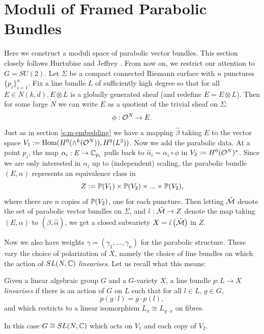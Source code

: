 	\section{Moduli of Framed Parabolic Bundles}
	Here we construct a moduli space of parabolic vector bundles. This section closely follows Hurtubise and Jeffrey \cite[\S 4]{hurtubise_representations_2000}. From now on, we restrict our attention to $G=SU(2)$. Let $\Sigma$ be a compact connected Riemann surface with $n$ punctures $\{p_i\}_{i=1}^n$. Fix a line bundle $L$ of sufficiently high degree so that for all $E\in N(k,d), E\otimes L$ is a globally generated sheaf (and redefine $E = E\otimes L$). Then for some large $N$ we can write $E$ as a quotient of the trivial sheaf on $\Sigma$:
	\begin{equation}
		\phi: \mathcal{O}^N \to E.
	\end{equation}
	Just as in section \ref{s:m-embedding} we have a mapping $\hat{\beta}$ taking $E$ to the vector space $V_1 := \text{Hom}(H^0(\wedge^k(\mathcal{O}^N)), H^0(L^2))$. Now we add the parabolic data. At a point $p_i$, the map $\alpha_i:E\to \mathbb{C}_{p_i}$ pulls back to $\hat{\alpha}_i = \alpha_i\circ \phi$ in $V_2 := H^0(\mathcal{O}^N)^\ast$. Since we are only interested in $\alpha_i$ up to (independent) scaling, the parabolic bundle $(E,\alpha)$ represents an equivalence class in
	\begin{equation}
		Z := \mathbb{P}(V_1) \times \mathbb{P}(V_2) \times ... \times \mathbb{P}(V_2),
	\end{equation}
	where there are $n$ copies of $\mathbb{P}(V_2)$, one for each puncture. Then letting $\tilde{\mathcal{M}}$ denote the set of parabolic vector bundles on $\Sigma$, and $\tilde{\iota}:\tilde{\mathcal{M}}\to Z$ denote the map taking $(E,\alpha)$ to $(\hat{\beta},\hat{\alpha})$, we get a closed subvariety $X = \tilde{\iota}\left(\tilde{\mathcal{M}}\right)$ in $Z$. 

	Now we also have weights $\gamma = (\gamma_1,...,\gamma_n)$ for the parabolic structure. These vary the choice of polarization of $X$, namely the choice of line bundles on which the action of $SL(N,\mathbb{C})$ \textit{linearises}. Let us recall what this means:
	\begin{definition}
		Given a linear algebraic group $G$ and a $G$-variety $X$, a line bundle $p:L\to X$ \emph{linearises} if there is an action of $G$ on $L$ such that for all $l\in L$, $g\in G$,
		\begin{equation}
			p(g\cdot l) = g\cdot p(l),
		\end{equation}
		and which restricts to a linear isomorphism $L_x \cong L_{g\cdot x}$ on fibres.
	\end{definition}
	In this case $G\cong SL(N,\mathbb{C})$ which acts on $V_1$ and each copy of $V_2$.
	

